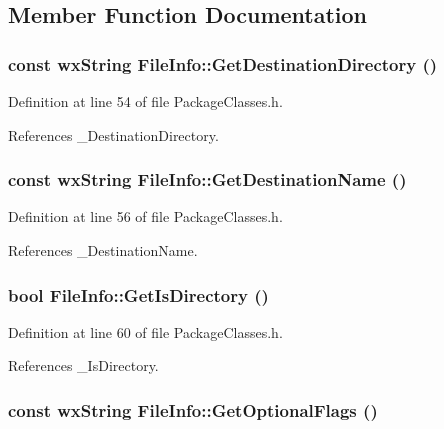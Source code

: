 \subsection{Member Function Documentation}
\subsubsection{\setlength{\rightskip}{0pt plus 5cm}const wx\-String File\-Info::Get\-Destination\-Directory ()\hspace{0.3cm}{\tt  [inline]}}\label{class_file_info_e05d19113b920d8364e7e1c52f4b1394}




Definition at line 54 of file Package\-Classes.h.

References \_\-Destination\-Directory.
\subsubsection{\setlength{\rightskip}{0pt plus 5cm}const wx\-String File\-Info::Get\-Destination\-Name ()\hspace{0.3cm}{\tt  [inline]}}\label{class_file_info_9c9a1e27068b32604853affee58787dc}




Definition at line 56 of file Package\-Classes.h.

References \_\-Destination\-Name.
\subsubsection{\setlength{\rightskip}{0pt plus 5cm}bool File\-Info::Get\-Is\-Directory ()\hspace{0.3cm}{\tt  [inline]}}\label{class_file_info_702d186cf8b65523cb281003eb2ad079}




Definition at line 60 of file Package\-Classes.h.

References \_\-Is\-Directory.
\subsubsection{\setlength{\rightskip}{0pt plus 5cm}const wx\-String File\-Info::Get\-Optional\-Flags ()\hspace{0.3cm}{\tt  [inline]}}\label{class_file_info_df5cdadebdb6f25ad187d784c034ed31}




